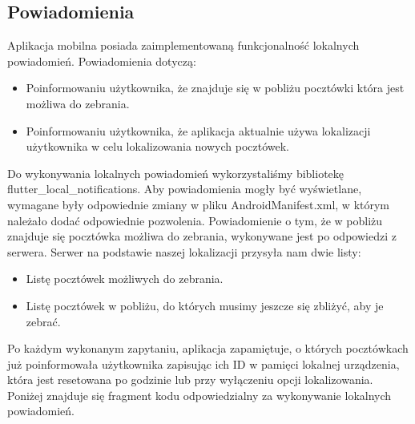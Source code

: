 \documentclass[a4paper,twoside,12pt]{book}
\begin{document}
\subsection{Powiadomienia}

Aplikacja mobilna posiada zaimplementowaną funkcjonalność lokalnych powiadomień. Powiadomienia dotyczą:
\begin{itemize}
    \item Poinformowaniu użytkownika, że znajduje się w pobliżu pocztówki która jest możliwa do zebrania. 
    \item Poinformowaniu użytkownika, że aplikacja aktualnie używa lokalizacji użytkownika w celu lokalizowania nowych pocztówek.
\end{itemize}
Do wykonywania lokalnych powiadomień wykorzystaliśmy bibliotekę \newline flutter\_local\_notifications. Aby powiadomienia mogły być wyświetlane, wymagane były odpowiednie zmiany w pliku AndroidManifest.xml, w którym należało dodać odpowiednie pozwolenia.
Powiadomienie o tym, że w pobliżu znajduje się pocztówka możliwa do zebrania, wykonywane jest po odpowiedzi z serwera. Serwer na podstawie naszej lokalizacji przysyła nam dwie listy:
\begin{itemize}
    \item Listę pocztówek możliwych do zebrania.
    \item Listę pocztówek w pobliżu, do których musimy jeszcze się zbliżyć, aby je zebrać.
\end{itemize}
Po każdym wykonanym zapytaniu, aplikacja zapamiętuje, o których pocztówkach już poinformowała użytkownika zapisując ich ID w pamięci lokalnej urządzenia, która jest resetowana po godzinie lub przy wyłączeniu opcji lokalizowania. Poniżej znajduje się fragment kodu odpowiedzialny za wykonywanie lokalnych powiadomień.
\newpage
\end{document}
